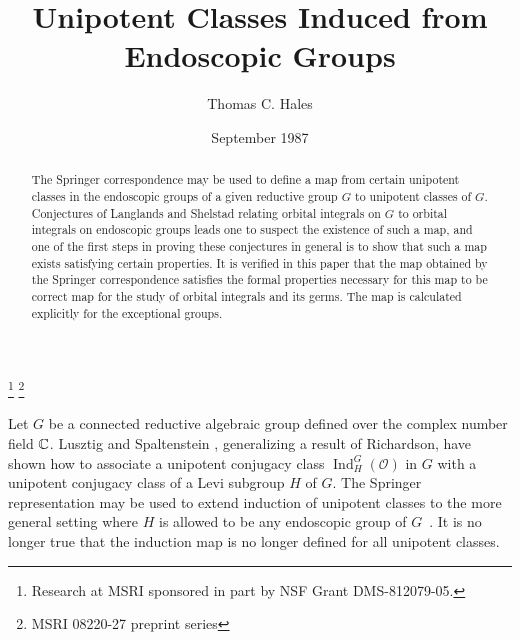 \documentclass{amsart}
\newcommand\C		{{\Bbb C}}
\newcommand\Ind	{\operatorname{Ind}}
\newcommand\cO		{{\mathcal O}}
\begin{document}
\begin{abstract}
The Springer correspondence may be used to define a map from
certain unipotent classes in the endoscopic groups of a given
reductive group $G$ to unipotent classes of $G$.  Conjectures of
Langlands and Shelstad relating orbital integrals on $G$ to
orbital integrals on endoscopic groups leads one to suspect the
existence of such a map, and one of the first steps in proving
these conjectures in general is to show that such a map exists
satisfying certain properties. It is verified in this paper that
the map obtained by the Springer correspondence satisfies the
formal properties necessary for this map to be correct map for
the study of orbital integrals and its germs.  The map is
calculated explicitly for the exceptional groups.
\end{abstract}


\title {Unipotent Classes Induced from Endoscopic Groups}
\author {Thomas C. Hales}
\thanks{Research at MSRI sponsored in part by NSF Grant DMS-812079-05.}
\thanks{MSRI 08220-27 preprint series}
\date{September 1987}
\address{Mathematical Sciences Research Institute}

\maketitle

%
%
%


Let $G$ be a connected reductive algebraic group defined over the
complex
number field $\C$.  Lusztig and Spaltenstein \cite{LS},
generalizing a result
of Richardson, have shown 
how to associate a unipotent conjugacy class $\Ind_H^G(\cO)$ in
$G$ with a
unipotent conjugacy class of a Levi subgroup $H$ of $G$.  The
Springer 
representation may be used to extend induction of unipotent
classes to the
more general setting where $H$ is allowed to be any endoscopic
group of 
$G$~\cite{Lu}.  It is no longer true that the
induction map is no longer defined for all unipotent classes.
\end{document}
